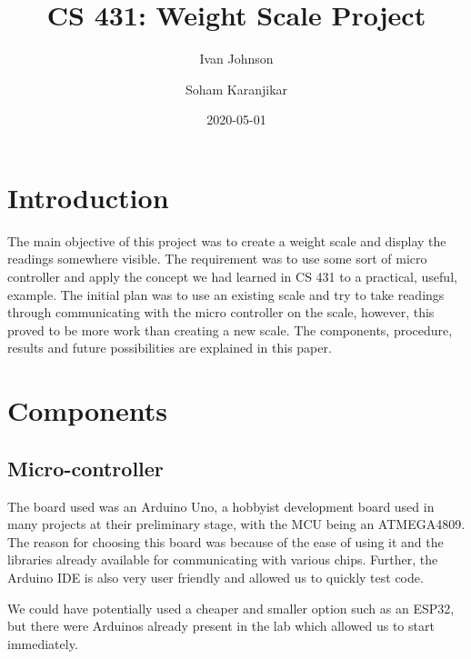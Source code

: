 \documentclass[10pt]{article}
\title{CS 431: Weight Scale Project}
\author{Ivan Johnson \and Soham Karanjikar}
\date{2020-05-01}
\begin{document}
\maketitle

{\begin{flushleft}
{\newpage \Large\section{Introduction}\par}
{\large The main objective of this project was to create a weight scale and display the readings somewhere visible. The requirement was to use some sort of micro controller and apply the concept we had learned in CS 431 to a practical, useful, example. The initial plan was to use an existing scale and try to take readings through communicating with the micro controller on the scale, however, this proved to be more work than creating a new scale. The components, procedure, results and future possibilities are explained in this paper.
\par}


\vspace{.12 in}


{\Large\section{Components}\par}
{\large\subsection{Micro-controller}\par}
{\large
The board used was an Arduino Uno, a hobbyist development board used in many projects at their preliminary stage, with the MCU being an ATMEGA4809. The reason for choosing this board was because of the ease of using it and the libraries already available for communicating with various chips. Further, the Arduino IDE is also very user friendly and allowed us to quickly test code.

We could have potentially used a cheaper and smaller option such as an ESP32, but there were Arduinos already present in the lab which allowed us to start immediately.

}
\end{flushleft}}
\end{document}
